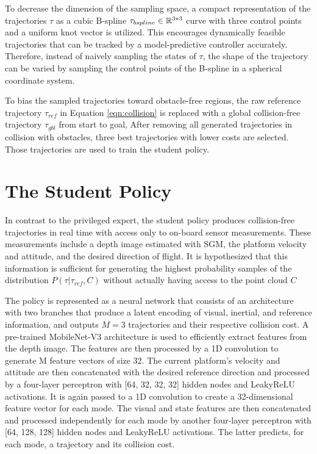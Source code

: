 To decrease the dimension of the sampling space, a compact
representation of the trajectories $\tau$ as a cubic B-spline $\tau_{bspline} \in \mathbb{R}^{3*3}$ curve with three control points and a
uniform knot vector is utilized. This encourages dynamically feasible trajectories that can be tracked by a model-predictive controller accurately. Therefore, instead of naively sampling the states of $\tau$, the shape of the trajectory can be varied by sampling the control points of the B-spline in a spherical coordinate system.

To bias the sampled trajectories toward obstacle-free regions, the raw reference trajectory $\tau_{ref}$ in Equation \ref{eqn:collision} is replaced with a global
collision-free trajectory $\tau_{gbl}$ from start to goal, After removing all generated trajectories
in collision with obstacles, three best trajectories with
lower costs are selected. Those trajectories are used to train the student policy.


\section{The Student Policy}
In contrast to the privileged expert, the student policy produces
collision-free trajectories in real time with access only to on-board
sensor measurements. These measurements include a depth image
estimated with SGM, the platform velocity and attitude, and the
desired direction of flight. It is hypothesized that this information is
sufficient for generating the highest probability samples of the distribution $P(\tau | \tau_{ref}, C)$ without actually having access to the point cloud $C$ 

The policy is represented as a neural network that consists of an architecture with two branches that produce a latent encoding of visual,
inertial, and reference information, and outputs $M = 3$ trajectories
and their respective collision cost. A pre-trained MobileNet-V3 \cite{MobileNet} architecture is used to efficiently extract features from the depth image. The features are then processed by a 1D convolution to generate
M feature vectors of size 32. The current platform’s velocity and
attitude are then concatenated with the desired reference direction
and processed by a four-layer perceptron with [64, 32, 32, 32] hidden
nodes and LeakyReLU activations. It is again passed to a 1D convolution to create a 32-dimensional feature vector for each mode. The visual
and state features are then concatenated and processed independently
 for each mode by another four-layer perceptron with [64, 128, 128]
hidden nodes and LeakyReLU activations. The latter predicts, for
each mode, a trajectory and its collision cost. 

